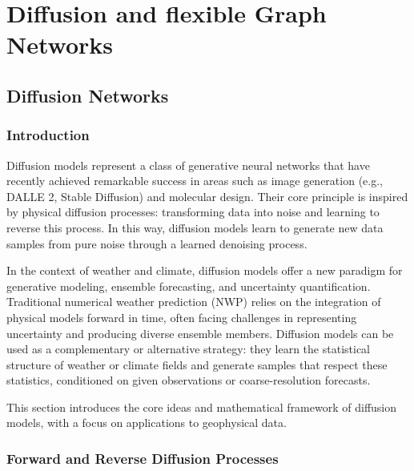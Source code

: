 \chapter{Diffusion and flexible Graph Networks}

%
\section{Diffusion Networks}

%
\subsection{Introduction}

Diffusion models represent a class of generative neural networks that have recently achieved remarkable success in areas such as image generation (e.g., DALL\textperiodcentered E 2, Stable Diffusion) and molecular design. Their core principle is inspired by physical diffusion processes: transforming data into noise and learning to reverse this process. In this way, diffusion models learn to generate new data samples from pure noise through a learned denoising process.

In the context of weather and climate, diffusion models offer a new paradigm for generative modeling, ensemble forecasting, and uncertainty quantification. Traditional numerical weather prediction (NWP) relies on the integration of physical models forward in time, often facing challenges in representing uncertainty and producing diverse ensemble members. Diffusion models can be used as a complementary or alternative strategy: they learn the statistical structure of weather or climate fields and generate samples that respect these statistics, conditioned on given observations or coarse-resolution forecasts.

This section introduces the core ideas and mathematical framework of diffusion models, with a focus on applications to geophysical data.

%
\subsection{Forward and Reverse Diffusion Processes}

